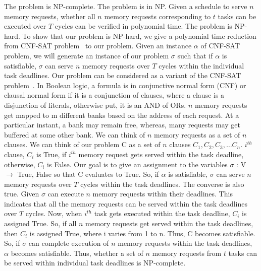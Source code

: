 \noindent
The problem is NP-complete.
\newline
\newline
The problem is in NP.
\newline
\newline
Given a schedule to serve $n$ memory requests, whether all $n$ memory requests corresponding to $t$ tasks can be executed over $T$ 
cycles can be verified in polynomial time.
\newline
\newline
The problem is NP-hard.
\newline
\newline
To show that our problem is NP-hard, we give a polynomial time reduction from CNF-SAT problem~\cite{wiki:xxx8} to our problem.
Given an instance $\alpha$ of CNF-SAT problem, we will generate an instance of our problem $\sigma$ such that if $\alpha$
is satisfiable, $\sigma$ can serve $n$ memory requests over $T$ cycles within the individual task deadlines. 
\newline
\newline
Our problem can be considered as a variant of the CNF-SAT problem~\cite{wiki:xxx8}. In Boolean logic, a formula is in conjunctive normal 
form (CNF) or clausal normal form if it is a conjunction of clauses, where a clause is a disjunction of literals, otherwise 
put, it is an AND of ORs. $n$ memory requests get mapped to m different banks based on the address of each request. At a 
particular instant, a bank may remain free, whereas, many requests may get buffered at some other bank. We can think of $n$ 
memory requests as a set of $n$ clauses. We can think of our problem C as a set of $n$ clauses ${C_{1},C_{2},C_{3},\dots C_{n}}$.
$i^{th}$ clause, $C_{i}$ is True, if $i^{th}$ memory request gets served within the task deadline, otherwise, $C_{i}$ is False.
Our goal is to give an assignment to the variables $\sigma$ : V $\rightarrow$ {True, False} so that C evaluates to True.
So, if $\alpha$ is satisfiable, $\sigma$ can serve $n$ memory requests over $T$ cycles within the task deadlines.
\newline
\newline
The converse is also true.
\newline
\newline
Given $\sigma$ can execute $n$ memory requests within their deadlines. This indicates that all the memory requests can be served 
within the task deadlines over $T$ cycles. Now, when $i^{th}$ task gets executed within the task deadline, $C_{i}$ is assigned 
True. So, if all $n$ memory requests get served within the task deadlines, then $C_{i}$ is assigned True, where i varies from 1 
to n. Thus, C becomes satisfiable. So, if $\sigma$ can complete execution of $n$ memory requests within the task deadlines, 
$\alpha$ becomes satisfiable.
\newline
\newline
Thus, whether a set of $n$ memory requests from $t$ tasks can be served within individual task deadlines is NP-complete.



